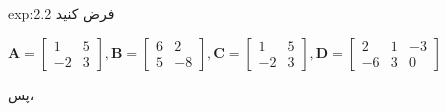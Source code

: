 {\begin{spacing}{1.5}
        \begin{example}{exp:2.2}
            \Large
            فرض کنید
            \begin{center}
                $\textbf{A}=\begin{bmatrix}
                                1  & 5 \\
                                -2 & 3
                \end{bmatrix}, \textbf{B}=\begin{bmatrix}
                                              6 & 2  \\
                                              5 & -8
                \end{bmatrix}, \textbf{C}=\begin{bmatrix}
                                              1  & 5 \\
                                              -2 & 3
                \end{bmatrix}, \textbf{D}=\begin{bmatrix}
                                              2  & 1 & -3 \\
                                              -6 & 3 & 0
                \end{bmatrix}$
            \end{center}
            \textbf{\vspace{12pt}}
            پس،
\end{example}
\end{spacing}}
